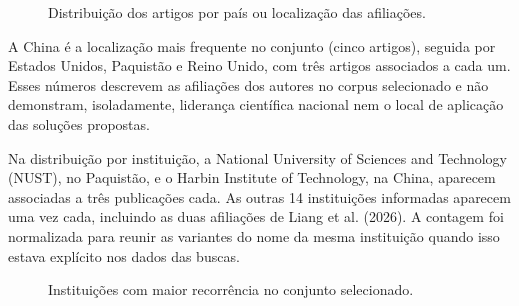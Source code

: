 \begin{figure}[htbp]
\centering

\caption{Distribuição dos artigos por país ou localização das afiliações.}
\label{fig:distribuicao-paises}
\end{figure}

A China é a localização mais frequente no conjunto (cinco artigos), seguida por Estados Unidos, Paquistão e Reino Unido, com três artigos associados a cada um. Esses números descrevem as afiliações dos autores no corpus selecionado e não demonstram, isoladamente, liderança científica nacional nem o local de aplicação das soluções propostas.

Na distribuição por instituição, a National University of Sciences and Technology (NUST), no Paquistão, e o Harbin Institute of Technology, na China, aparecem associadas a três publicações cada. As outras 14 instituições informadas aparecem uma vez cada, incluindo as duas afiliações de Liang et al. (2026). A contagem foi normalizada para reunir as variantes do nome da mesma instituição quando isso estava explícito nos dados das buscas.

\begin{figure}[htbp]
\centering

\caption{Instituições com maior recorrência no conjunto selecionado.}
\label{fig:instituicoes-recorrentes}
\end{figure}

